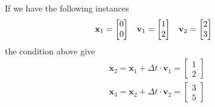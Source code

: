 \documentclass[12pt,a4paper]{book}
\begin{document}
If we have the following instances
\begin{equation*}
\mathbf{x}_1= \begin{bmatrix}
0 \\ 0
\end{bmatrix} \hspace*{0.3cm}
\mathbf{v}_1= \begin{bmatrix}
1 \\ 2
\end{bmatrix} \hspace*{0.3cm}
\mathbf{v}_2= \begin{bmatrix}
2 \\ 3
\end{bmatrix} \hspace*{0.3cm}
\end{equation*}
the condition above give
\begin{eqnarray*}
\mathbf{x}_2=\mathbf{x}_1+\Delta t \cdot \mathbf{v}_1 =
\begin{bmatrix}
1 \\ 2
\end{bmatrix} \\
\mathbf{x}_3=\mathbf{x}_2+\Delta t \cdot \mathbf{v}_2 =
\begin{bmatrix}
3 \\ 5
\end{bmatrix}
\end{eqnarray*}
\end{document}
